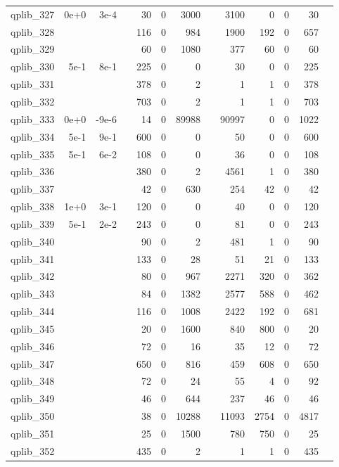 \begin{table}
\begin{tabular}{lrrrrrrrrrrrr}
qplib\_327	&	0e+0	&	3e-4	&	&	30	&	0	&	3000	&	&	3100	&	0	&	0	&	30	\\
qplib\_328	&		&		&	&	116	&	0	&	984	&	&	1900	&	192	&	0	&	657	\\
qplib\_329	&		&		&	&	60	&	0	&	1080	&	&	377	&	60	&	0	&	60	\\
qplib\_330	&	5e-1	&	8e-1	&	&	225	&	0	&	0	&	&	30	&	0	&	0	&	225	\\
qplib\_331	&		&		&	&	378	&	0	&	2	&	&	1	&	1	&	0	&	378	\\
qplib\_332	&		&		&	&	703	&	0	&	2	&	&	1	&	1	&	0	&	703	\\
qplib\_333	&	0e+0	&	-9e-6	&	&	14	&	0	&	89988	&	&	90997	&	0	&	0	&	1022	\\
qplib\_334	&	5e-1	&	9e-1	&	&	600	&	0	&	0	&	&	50	&	0	&	0	&	600	\\
qplib\_335	&	5e-1	&	6e-2	&	&	108	&	0	&	0	&	&	36	&	0	&	0	&	108	\\
qplib\_336	&		&		&	&	380	&	0	&	2	&	&	4561	&	1	&	0	&	380	\\
qplib\_337	&		&		&	&	42	&	0	&	630	&	&	254	&	42	&	0	&	42	\\
qplib\_338	&	1e+0	&	3e-1	&	&	120	&	0	&	0	&	&	40	&	0	&	0	&	120	\\
qplib\_339	&	5e-1	&	2e-2	&	&	243	&	0	&	0	&	&	81	&	0	&	0	&	243	\\
qplib\_340	&		&		&	&	90	&	0	&	2	&	&	481	&	1	&	0	&	90	\\
qplib\_341	&		&		&	&	133	&	0	&	28	&	&	51	&	21	&	0	&	133	\\
qplib\_342	&		&		&	&	80	&	0	&	967	&	&	2271	&	320	&	0	&	362	\\
qplib\_343	&		&		&	&	84	&	0	&	1382	&	&	2577	&	588	&	0	&	462	\\
qplib\_344	&		&		&	&	116	&	0	&	1008	&	&	2422	&	192	&	0	&	681	\\
qplib\_345	&		&		&	&	20	&	0	&	1600	&	&	840	&	800	&	0	&	20	\\
qplib\_346	&		&		&	&	72	&	0	&	16	&	&	35	&	12	&	0	&	72	\\
qplib\_347	&		&		&	&	650	&	0	&	816	&	&	459	&	608	&	0	&	650	\\
qplib\_348	&		&		&	&	72	&	0	&	24	&	&	55	&	4	&	0	&	92	\\
qplib\_349	&		&		&	&	46	&	0	&	644	&	&	237	&	46	&	0	&	46	\\
qplib\_350	&		&		&	&	38	&	0	&	10288	&	&	11093	&	2754	&	0	&	4817	\\
qplib\_351	&		&		&	&	25	&	0	&	1500	&	&	780	&	750	&	0	&	25	\\
qplib\_352	&		&		&	&	435	&	0	&	2	&	&	1	&	1	&	0	&	435	\\

\end{tabular}
\end{table}
